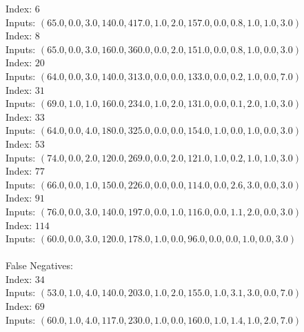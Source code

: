 \begin{enumerate}
\begin{enumerate}
					\textnormal{Index: } \( 6 \) \\
					\textnormal{Inputs: } \( (65.0, 0.0, 3.0, 140.0, 417.0, 1.0, 2.0, 157.0, 0.0, 0.8, 1.0, 1.0, 3.0) \) \\
					\textnormal{Index: } \( 8 \) \\
					\textnormal{Inputs: } \( (65.0, 0.0, 3.0, 160.0, 360.0, 0.0, 2.0, 151.0, 0.0, 0.8, 1.0, 0.0, 3.0) \) \\
					\textnormal{Index: } \( 20 \) \\
					\textnormal{Inputs: } \( (64.0, 0.0, 3.0, 140.0, 313.0, 0.0, 0.0, 133.0, 0.0, 0.2, 1.0, 0.0, 7.0) \) \\
					\textnormal{Index: } \( 31 \) \\
					\textnormal{Inputs: } \( (69.0, 1.0, 1.0, 160.0, 234.0, 1.0, 2.0, 131.0, 0.0, 0.1, 2.0, 1.0, 3.0) \) \\
					\textnormal{Index: } \( 33 \) \\
					\textnormal{Inputs: } \( (64.0, 0.0, 4.0, 180.0, 325.0, 0.0, 0.0, 154.0, 1.0, 0.0, 1.0, 0.0, 3.0) \) \\
					\textnormal{Index: } \( 53 \) \\
					\textnormal{Inputs: } \( (74.0, 0.0, 2.0, 120.0, 269.0, 0.0, 2.0, 121.0, 1.0, 0.2, 1.0, 1.0, 3.0) \) \\
					\textnormal{Index: } \( 77 \) \\
					\textnormal{Inputs: } \( (66.0, 0.0, 1.0, 150.0, 226.0, 0.0, 0.0, 114.0, 0.0, 2.6, 3.0, 0.0, 3.0) \) \\
					\textnormal{Index: } \( 91 \) \\
					\textnormal{Inputs: } \( (76.0, 0.0, 3.0, 140.0, 197.0, 0.0, 1.0, 116.0, 0.0, 1.1, 2.0, 0.0, 3.0) \) \\
					\textnormal{Index: } \( 114 \) \\
					\textnormal{Inputs: } \( (60.0, 0.0, 3.0, 120.0, 178.0, 1.0, 0.0, 96.0, 0.0, 0.0, 1.0, 0.0, 3.0) \) \\ \\
					\textnormal{False Negatives: } \\
					\textnormal{Index: } \( 34 \) \\
					\textnormal{Inputs: } \( (53.0, 1.0, 4.0, 140.0, 203.0, 1.0, 2.0, 155.0, 1.0, 3.1, 3.0, 0.0, 7.0) \) \\
					\textnormal{Index: } \( 69 \) \\
					\textnormal{Inputs: } \( (60.0, 1.0, 4.0, 117.0, 230.0, 1.0, 0.0, 160.0, 1.0, 1.4, 1.0, 2.0, 7.0) \) \\

\end{enumerate}
\end{enumerate}
